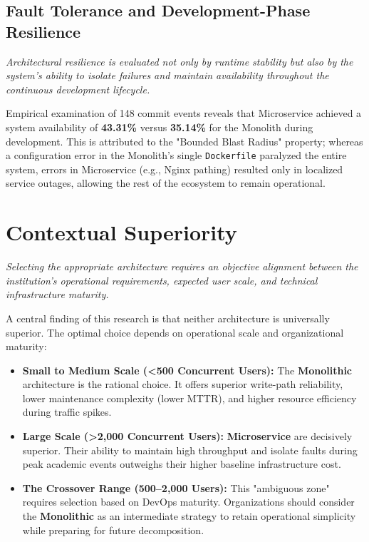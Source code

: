 \subsection{Fault Tolerance and Development-Phase Resilience}
\textit{Architectural resilience is evaluated not only by runtime stability but also by the system's ability to isolate failures and maintain availability throughout the continuous development lifecycle.}

Empirical examination of 148 commit events reveals that Microservice achieved a system availability of \textbf{43.31\%} versus \textbf{35.14\%} for the Monolith during development. This is attributed to the "Bounded Blast Radius" property; whereas a configuration error in the Monolith's single \texttt{Dockerfile} paralyzed the entire system, errors in Microservice (e.g., Nginx pathing) resulted only in localized service outages, allowing the rest of the ecosystem to remain operational.

\section{Contextual Superiority}
\textit{Selecting the appropriate architecture requires an objective alignment between the institution's operational requirements, expected user scale, and technical infrastructure maturity.}

A central finding of this research is that neither architecture is universally superior. The optimal choice depends on operational scale and organizational maturity:

\begin{itemize}
    \item \textbf{Small to Medium Scale (<500 Concurrent Users):} The \textbf{Monolithic} architecture is the rational choice. It offers superior write-path reliability, lower maintenance complexity (lower MTTR), and higher resource efficiency during traffic spikes.
    \item \textbf{Large Scale (>2,000 Concurrent Users):} \textbf{Microservice} are decisively superior. Their ability to maintain high throughput and isolate faults during peak academic events outweighs their higher baseline infrastructure cost.
    \item \textbf{The Crossover Range (500--2,000 Users):} This "ambiguous zone" requires selection based on DevOps maturity. Organizations should consider the \textbf{Monolithic} as an intermediate strategy to retain operational simplicity while preparing for future decomposition.
\end{itemize}

